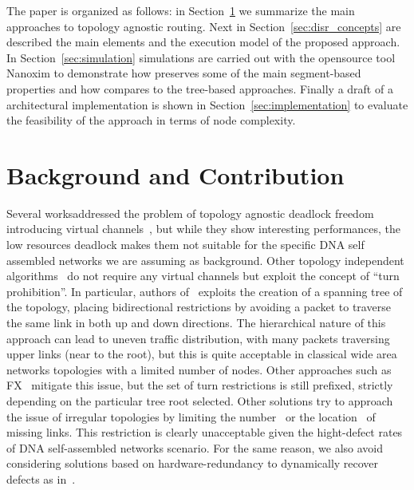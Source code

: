 The paper is organized as follows: in Section~\ref{sec:related_works}
we summarize the main approaches to topology agnostic routing. Next in
Section~\ref{sec:disr_concepts} are described the main elements and
the execution model of the proposed approach.  In Section~\ref{sec:simulation}
simulations are carried out with the opensource tool Nanoxim to
demonstrate how \disr{} preserves some of the main segment-based
properties and how compares to the tree-based approaches. Finally a
draft of a architectural implementation is shown in
Section~\ref{sec:implementation} to evaluate the feasibility of the
approach in terms of node complexity.

\section{Background and Contribution}
\label{sec:related_works}
Several worksaddressed the problem of topology agnostic deadlock
freedom introducing virtual channels~\cite{sancho2002, skeie2002,
skeie2004, koibuchi2003}, but while they show interesting
performances, the low resources deadlock makes them not suitable for
the specific DNA self assembled networks we are assuming as
background.
Other topology independent algorithms~\cite{schroeder1991,
koibuchi2001, cherkasova1996} do not require any virtual channels but
exploit the concept of ``turn prohibition''.
In particular, authors of~\cite{Patwardhan05evaluatingthe} exploits the creation of a spanning tree of the
topology, placing bidirectional restrictions by avoiding a packet
to traverse the same link in both up and down directions.
The hierarchical nature of this approach can lead to uneven traffic
distribution, with many packets traversing upper links (near to the
root), but this is quite acceptable in classical wide area networks
topologies with a limited number of nodes. Other approaches such as
FX~\cite{sancho2000} mitigate this
issue, but the set of turn restrictions is still prefixed,
strictly depending on the particular tree root selected. 
Other solutions try to approach the issue of irregular
topologies by limiting the number~\cite{duato1997, gomez2004, koibuchi2008} or the
location~\cite{zhang2008, flich2008, liu2011} of missing links. This
restriction is clearly unacceptable given the hight-defect rates of
DNA self-assembled networks scenario. For the same reason, we also
avoid considering solutions based on hardware-redundancy to
dynamically recover defects as in~\cite{constantinides2006, kohler2010,  park2006, ebrahimi2013}. 


